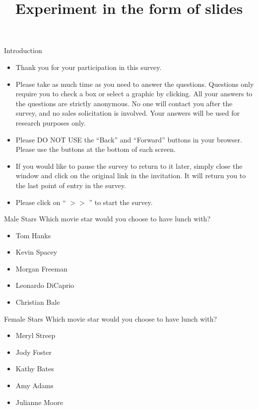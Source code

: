 \documentclass{beamer}
\title{Experiment in the form of slides}
\begin{document}
\maketitle

\begin{frame}{Introduction}
	\begin{scriptsize}
	\begin{itemize}
		\item Thank you for your participation in this survey. 
		\item Please take as much time as you need to answer the questions.
		Questions only require you to check a box or select a graphic by clicking.
		All your answers to the questions are strictly anonymous. No one will
		contact you after the survey, and no sales solicitation is involved.
		Your answers will be used for research purposes only.
		\item Please DO NOT USE the ``Back'' and ``Forward'' buttons in your
		browser. Please use the buttons at the bottom of each screen.
		\item If you would like to pause the survey to return to it later, simply close the window and click on the original link in the invitation. It will return you to the last point of entry in the survey.
		\item Please click on `` $>>$ '' to start the survey.	
	\end{itemize}
	\end{scriptsize}
\end{frame}

\begin{frame}{Male Stars}
Which movie star would you choose to have lunch with?

\begin{itemize}
	\item Tom Hanks
	\item Kevin Spacey
	\item Morgan Freeman
	\item Leonardo DiCaprio
	\item Christian Bale
\end{itemize}
\end{frame}

\begin{frame}{Female Stars}
Which movie star would you choose to have lunch with?

\begin{itemize}
	\item Meryl Streep
	\item Jody Foster
	\item Kathy Bates
	\item Amy Adams
	\item Julianne Moore
\end{itemize}
\end{frame}
\end{document}
